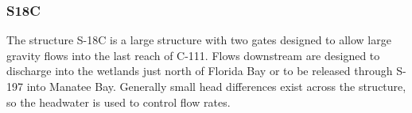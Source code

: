 
%
%


\clearpage
\subsubsection{S18C}

The structure S-18C is a large structure with two gates designed to allow large gravity flows into the last reach of C-111.
Flows downstream are designed to discharge into the wetlands just north of Florida Bay or to be released through S-197 into Manatee Bay.
Generally small head differences exist across the structure, so the headwater is used to control flow rates.

